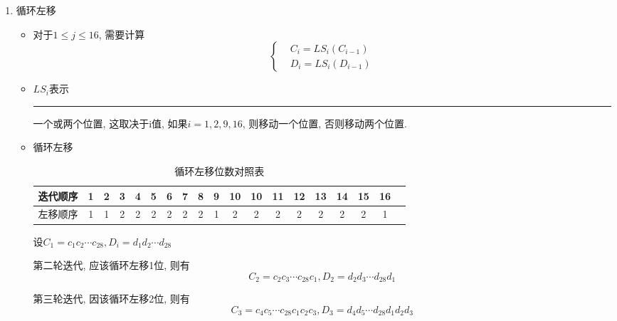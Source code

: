 \documentclass[UTF8]{ctexart}
\newcommand\hl{\bgroup\markoverwith
  {\textcolor{yellow}{\rule[-.5ex]{2pt}{2.5ex}}}\ULon}
\begin{document}
\begin{itemize}
\begin{enumerate}
\begin{itemize}
\begin{table}[h]
\begin{tabular}{|c|c|c|c|c|c|c|c|}
                        \end{tabular}
                \end{table}
            \end{itemize}
            \item 循环左移
            \begin{itemize}
                \item 对于$1\le j\le 16$, 需要计算
                $$
                \left\{ \begin{aligned}
                    &C_i=LS_i(C_{i-1})\\
                    &D_i=LS_i(D_{i-1})
                \end{aligned}\right.
                $$
                \item $LS_i$表示\hl{循环左移}一个或两个位置, 这取决于i值, 如果$i=1,2,9,16$, 则移动一个位置, 否则移动两个位置.
                \item 循环左移
                \begin{table}
                    \centering
                    \caption{循环左移位数对照表}
                    \begin{tabular}{|c|c|c|c|c|c|c|c|c|c|c|c|c|c|c|c|c|c|c|}
                        \hline
                        迭代顺序 &1 &2 &3 &4 &5 &6 &7 &8 &9 &10 &10 &11 &12 &13 &14 &15 &16\\
                        \hline
                        左移顺序 &1 &1 &2 &2 &2 &2 &2 &2 &1 &2 &2 &2 &2 &2 &2 &2 &1\\
                        \hline
                    \end{tabular}
                \end{table}

                设$C_1=c_1c_2\cdots c_{28}, D_i=d_1d_2\cdots d_{28}$

                第二轮迭代, 应该循环左移1位, 则有
                $$C_2=c_2c_3\cdots c_{28}c_1, D_2=d_2d_3\cdots d_{28}d_1$$

                第三轮迭代, 因该循环左移2位, 则有
                $$C_3=c_4c_5\cdots c_{28}c_1c_2c_3, D_3=d_4d_5\cdots d_{28}d_1d_2d_3$$
            \end{itemize}


\end{enumerate}
\end{itemize}
\end{document}
